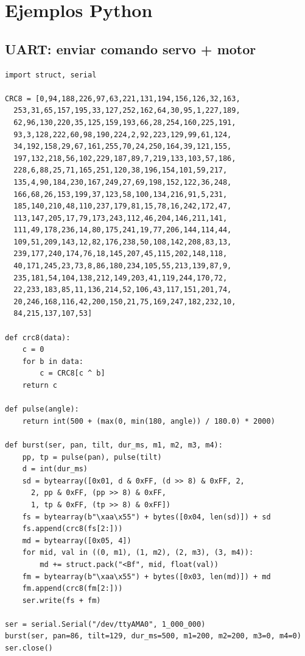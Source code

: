 \documentclass[11pt,a4paper]{article}
\begin{document}
\newpage


\section{Ejemplos Python}

\subsection{UART: enviar comando servo + motor}

\begin{lstlisting}[style=pystyle]
import struct, serial

CRC8 = [0,94,188,226,97,63,221,131,194,156,126,32,163,
  253,31,65,157,195,33,127,252,162,64,30,95,1,227,189,
  62,96,130,220,35,125,159,193,66,28,254,160,225,191,
  93,3,128,222,60,98,190,224,2,92,223,129,99,61,124,
  34,192,158,29,67,161,255,70,24,250,164,39,121,155,
  197,132,218,56,102,229,187,89,7,219,133,103,57,186,
  228,6,88,25,71,165,251,120,38,196,154,101,59,217,
  135,4,90,184,230,167,249,27,69,198,152,122,36,248,
  166,68,26,153,199,37,123,58,100,134,216,91,5,231,
  185,140,210,48,110,237,179,81,15,78,16,242,172,47,
  113,147,205,17,79,173,243,112,46,204,146,211,141,
  111,49,178,236,14,80,175,241,19,77,206,144,114,44,
  109,51,209,143,12,82,176,238,50,108,142,208,83,13,
  239,177,240,174,76,18,145,207,45,115,202,148,118,
  40,171,245,23,73,8,86,180,234,105,55,213,139,87,9,
  235,181,54,104,138,212,149,203,41,119,244,170,72,
  22,233,183,85,11,136,214,52,106,43,117,151,201,74,
  20,246,168,116,42,200,150,21,75,169,247,182,232,10,
  84,215,137,107,53]

def crc8(data):
    c = 0
    for b in data:
        c = CRC8[c ^ b]
    return c

def pulse(angle):
    return int(500 + (max(0, min(180, angle)) / 180.0) * 2000)

def burst(ser, pan, tilt, dur_ms, m1, m2, m3, m4):
    pp, tp = pulse(pan), pulse(tilt)
    d = int(dur_ms)
    sd = bytearray([0x01, d & 0xFF, (d >> 8) & 0xFF, 2,
      2, pp & 0xFF, (pp >> 8) & 0xFF,
      1, tp & 0xFF, (tp >> 8) & 0xFF])
    fs = bytearray(b"\xaa\x55") + bytes([0x04, len(sd)]) + sd
    fs.append(crc8(fs[2:]))
    md = bytearray([0x05, 4])
    for mid, val in ((0, m1), (1, m2), (2, m3), (3, m4)):
        md += struct.pack("<Bf", mid, float(val))
    fm = bytearray(b"\xaa\x55") + bytes([0x03, len(md)]) + md
    fm.append(crc8(fm[2:]))
    ser.write(fs + fm)

ser = serial.Serial("/dev/ttyAMA0", 1_000_000)
burst(ser, pan=86, tilt=129, dur_ms=500, m1=200, m2=200, m3=0, m4=0)
ser.close()
\end{lstlisting}
\end{document}
